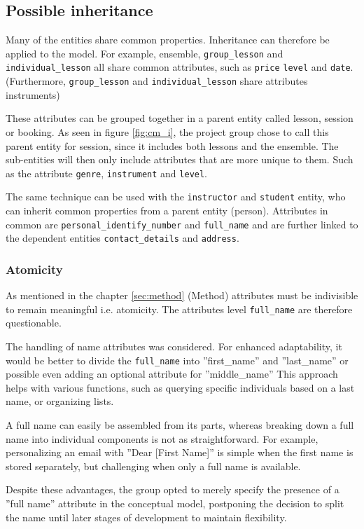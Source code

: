 \documentclass[a4paper]{scrartcl}
\begin{document}
\subsection*{Possible inheritance}
Many of the entities share common properties. 
Inheritance can therefore be applied to the model. 
For example, 
ensemble, 
\verb|group_lesson| and 
\verb|individual_lesson| 
all share common attributes, such as 
\verb|price|
\verb|level| and 
\verb|date|. 
(Furthermore, 
\verb|group_lesson| and 
\verb|individual_lesson| share attributes instruments)

These attributes can be grouped together
in a parent entity called lesson, session or booking. 
As seen in figure \ref{fig:cm_i}, the project group chose
to call this parent entity for session, since it includes both 
lessons and the ensemble.
The sub-entities will then only include attributes that are more
unique to them. 
Such as the attribute
\verb|genre|,
\verb|instrument| and
\verb|level|.

The same technique can be used with the 
\verb|instructor| and 
\verb|student| entity,
who can inherit common properties from a 
parent entity (person). 
Attributes in common are 
\verb|personal_identify_number| and 
\verb|full_name| 
and are further linked to the dependent entities 
\verb|contact_details|
and 
\verb|address|.
\subsubsection*{Atomicity}
As mentioned in the chapter \ref{sec:method} (Method) 
attributes must be indivisible to
remain meaningful i.e. atomicity.
The attributes
level
\verb|full_name|
are therefore questionable.

The handling of name attributes was considered. 
For enhanced adaptability,  it
would be better to divide the 
\verb|full_name| into ''first\_name'' and ''last\_name'' or
possible even adding an optional attribute for ''middle\_name'' 
This approach helps with various functions, such as querying specific
individuals based on a last name, or organizing lists.

A full name can easily be assembled from its parts, 
whereas breaking down a full
name into individual components is not as straightforward. 
For example,
personalizing an email with ''Dear [First Name]'' 
is simple when the first name is
stored separately, but challenging when only a full name is available.

Despite these advantages, the group opted to merely specify the presence of a
''full name'' attribute in the conceptual model, postponing the decision to split
the name until later stages of development to maintain flexibility.
\end{document}
